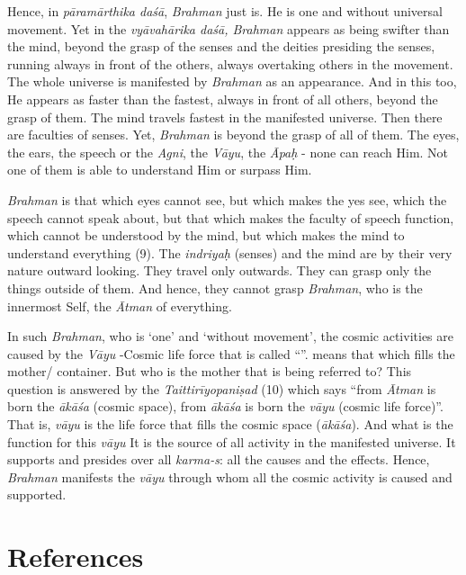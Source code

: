 Hence, in \emph{pāramārthika daśā}, \emph{Brahman} just is. He is one and without universal movement. Yet in the \emph{vyāvahārika daśā, Brahman} appears as being swifter than the mind, beyond the grasp of the senses and the deities presiding the senses, running always in front of the others, always overtaking others in the movement. The whole universe is manifested by \emph{Brahman} as an appearance. And in this too, He appears as faster than the fastest, always in front of all others, beyond the grasp of them. The mind travels fastest in the manifested universe. Then there are faculties of senses. Yet, \emph{Brahman} is beyond the grasp of all of them. The eyes, the ears, the speech or the \emph{Agni}, the \emph{Vāyu}, the \emph{Āpaḥ} - none can reach Him. Not one of them is able to understand Him or surpass Him.

\emph{Brahman} is that which eyes cannot see, but which makes the yes see, which the speech cannot speak about, but that which makes the faculty of speech function, which cannot be understood by the mind, but which makes the mind to understand everything (9). The \emph{indriyaḥ} (senses) and the mind are by their very nature outward looking. They travel only outwards. They can grasp only the things outside of them. And hence, they cannot grasp \emph{Brahman}, who is the innermost Self, the \emph{Ātman} of everything.

In such \emph{Brahman}, who is `one' and `without movement', the cosmic activities are caused by the \emph{Vāyu} -Cosmic life force that is called ``''.  means that which fills the mother/ container. But who is the mother that is being referred to? This question is answered by the \emph{Taittirīyopaniṣad} (10) which says ``from \emph{Ātman} is born the \emph{ākāśa} (cosmic space), from \emph{ākāśa} is born the \emph{vāyu} (cosmic life force)''. That is, \emph{vāyu} is the life force that fills the cosmic space (\emph{ākāśa}). And what is the function for this \emph{vāyu} It is the source of all activity in the manifested universe. It supports and presides over all \emph{karma-s}: all the causes and the effects. Hence, \emph{Brahman} manifests the \emph{vāyu} through whom all the cosmic activity is caused and supported.

\section*{References}

